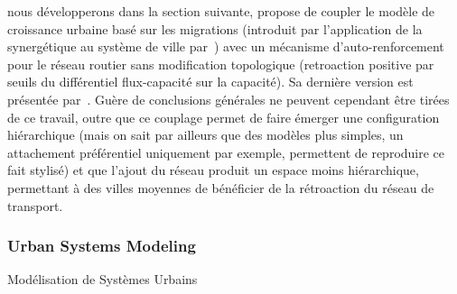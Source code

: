 {nous développerons dans la section suivante, \cite{baptiste1999interactions} propose de coupler le modèle de croissance urbaine basé sur les migrations (introduit par l'application de la synergétique au système de ville par~\cite{sanders1992systeme}) avec un mécanisme d'auto-renforcement pour le réseau routier sans modification topologique (retroaction positive par seuils du différentiel flux-capacité sur la capacité). Sa dernière version est présentée par~\cite{baptistemodeling}. Guère de conclusions générales ne peuvent cependant être tirées de ce travail, outre que ce couplage permet de faire émerger une configuration hiérarchique (mais on sait par ailleurs que des modèles plus simples, un attachement préférentiel uniquement par exemple, permettent de reproduire ce fait stylisé) et que l'ajout du réseau produit un espace moins hiérarchique, permettant à des villes moyennes de bénéficier de la rétroaction du réseau de transport.
}



\subsubsection{Urban Systems Modeling}{Modélisation de Systèmes Urbains}



